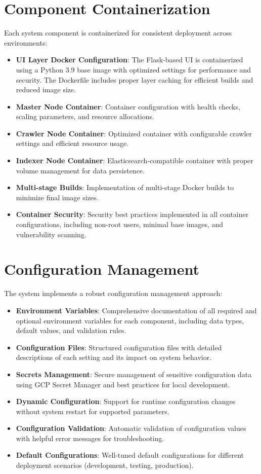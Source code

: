 \documentclass[12pt,a4paper]{report}
\begin{document}
\section{Component Containerization}
Each system component is containerized for consistent deployment across environments:
\begin{itemize}
    \item \textbf{UI Layer Docker Configuration}: The Flask-based UI is containerized using a Python 3.9 base image with optimized settings for performance and security. The Dockerfile includes proper layer caching for efficient builds and reduced image size.
    \item \textbf{Master Node Container}: Container configuration with health checks, scaling parameters, and resource allocations.
    \item \textbf{Crawler Node Container}: Optimized container with configurable crawler settings and efficient resource usage.
    \item \textbf{Indexer Node Container}: Elasticsearch-compatible container with proper volume management for data persistence.
    \item \textbf{Multi-stage Builds}: Implementation of multi-stage Docker builds to minimize final image sizes.
    \item \textbf{Container Security}: Security best practices implemented in all container configurations, including non-root users, minimal base images, and vulnerability scanning.
\end{itemize}

\section{Configuration Management}
The system implements a robust configuration management approach:
\begin{itemize}
    \item \textbf{Environment Variables}: Comprehensive documentation of all required and optional environment variables for each component, including data types, default values, and validation rules.
    \item \textbf{Configuration Files}: Structured configuration files with detailed descriptions of each setting and its impact on system behavior.
    \item \textbf{Secrets Management}: Secure management of sensitive configuration data using GCP Secret Manager and best practices for local development.
    \item \textbf{Dynamic Configuration}: Support for runtime configuration changes without system restart for supported parameters.
    \item \textbf{Configuration Validation}: Automatic validation of configuration values with helpful error messages for troubleshooting.
    \item \textbf{Default Configurations}: Well-tuned default configurations for different deployment scenarios (development, testing, production).
\end{itemize}
\end{document}
